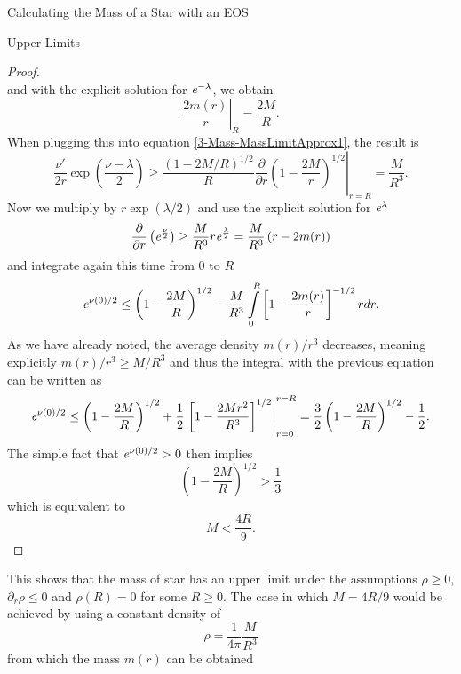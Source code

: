 \begin{section}{Calculating the Mass of a Star with an EOS}
\begin{subsection}{Upper Limits}
\begin{proof}
\begin{equation}
	\end{equation}
	and with the explicit solution for $\mathit{e}^{-\lambda}$, we obtain
	\begin{equation}
		\left.\frac{2m(r)}{r}\right|_R = \frac{2M}{R}.
	\end{equation}
	When plugging this into equation \eqref{3-Mass-MassLimitApprox1}, the result is
	\begin{equation}
		\frac{\nu'}{2r}\exp\left(\frac{\nu-\lambda}{2}\right)\geq\frac{(1-2M/R)^{1/2}}{R}\left.\frac{\partial}{\partial r}\left(1-\frac{2M}{r}\right)^{1/2}\right|_{r=R} = \frac{M}{R^3}.
	\end{equation}
	Now we multiply by $r\exp(\lambda/2)$ and use the explicit solution for $\mathit{e}^\lambda$
	\begin{equation}
		\frac{\partial}{\partial r}\left(\mathit{e}^{\frac{\nu}{2}}\right) \geq \frac{M}{R^3}r\mathit{e}^\frac{\lambda}{2} = \frac{M}{R^3}\left(r-2m(r)\right)
	\end{equation}
	and integrate again this time from $0$ to $R$
	\begin{equation}
		\mathit{e}^{\nu(0)/2}\leq\left(1-\frac{2M}{R}\right)^{1/2}-\frac{M}{R^3}\int\limits_0^R\left[1-\frac{2m(r)}{r} \right]^{-1/2}rdr.
		\label{3-Mass-MassLimitNuApprox}
	\end{equation}
	As we have already noted, the average density $m(r)/r^3$ decreases, meaning explicitly $m(r)/r^3\geq M/R^3$ and thus the integral with the previous equation can be written as
	\begin{equation}
		\mathit{e}^{\nu(0)/2}\leq\left(1-\frac{2M}{R}\right)^{1/2}+\frac{1}{2}\left.\left[1-\frac{2Mr^2}{R^3} \right]^{1/2}\right|^{r=R}_{r=0} = \frac{3}{2}\left(1-\frac{2M}{R}\right)^{1/2} - \frac{1}{2}.
	\end{equation}
	The simple fact that $\mathit{e}^{\nu(0)/2}>0$ then implies
	\begin{equation}
		\left(1-\frac{2M}{R}\right)^{1/2} > \frac{1}{3}
	\end{equation}
	which is equivalent to
	\begin{equation}
		M< \frac{4R}{9}.
	\end{equation}
\end{proof}\noindent
This shows that the mass of star has an upper limit under the assumptions $\rho\geq0$, $\partial_r\rho\leq0$ and $\rho(R)=0$ for some $R\geq0$. The case in which $M=4R/9$ would be achieved by using a constant density of 
\begin{equation}
	\rho = \frac{1}{4\pi}\frac{M}{R^3}
\end{equation}
from which the mass $m(r)$ can be obtained

\end{subsection}
\end{section}
